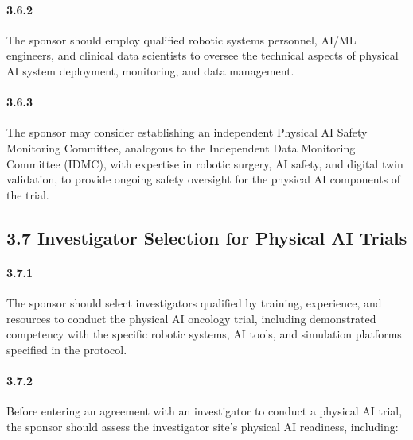 \documentclass[11pt]{article}
\begin{document}
\paragraph{3.6.2} The sponsor should employ qualified robotic systems personnel, AI/ML engineers, and clinical data scientists to oversee the technical aspects of physical AI system deployment, monitoring, and data management.

\paragraph{3.6.3} The sponsor may consider establishing an independent Physical AI Safety Monitoring Committee, analogous to the Independent Data Monitoring Committee (IDMC), with expertise in robotic surgery, AI safety, and digital twin validation, to provide ongoing safety oversight for the physical AI components of the trial.

\subsection{3.7 Investigator Selection for Physical AI Trials}

\paragraph{3.7.1} The sponsor should select investigators qualified by training, experience, and resources to conduct the physical AI oncology trial, including demonstrated competency with the specific robotic systems, AI tools, and simulation platforms specified in the protocol.

\paragraph{3.7.2} Before entering an agreement with an investigator to conduct a physical AI trial, the sponsor should assess the investigator site's physical AI readiness, including:
\end{document}
